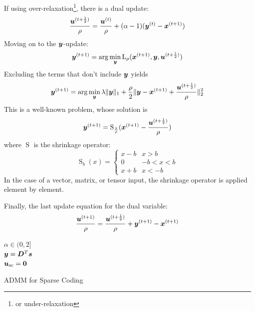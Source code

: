 If using over-relaxation\footnote{or under-relaxation}, there is a dual update:
\begin{equation}
\frac{\bm{u}^{(t + \frac{1}{2})}}{\rho} = \frac{\bm{u}^{(t)}}{\rho} + (\alpha - 1)(\bm{y}^{(t)} - \bm{x}^{(t + 1)})
\end{equation}
%
Moving on to the $\bm{y}$-update:
\begin{equation}
\bm{y}^{(t + 1)} = \arg\min_{\bm{y}} \operatorname{L}_{\rho}(\bm{x}^{(t + 1)},\bm{y},\bm{u}^{(t + \frac{1}{2})})
\end{equation}
%
Excluding the terms that don't include $\bm{y}$ yields
\begin{equation}
\bm{y}^{(t + 1)} = \arg\min_{\bm{y}} \lambda\|\bm{y}\|_1 + \frac{\rho}{2}\|\bm{y} - \bm{x}^{(t + 1)} + \frac{\bm{u}^{(t + \frac{1}{2})}}{\rho}\|_2^2
\end{equation}
%
This is a well-known problem, whose solution is
\begin{equation}
\bm{y}^{(t + 1)} = \operatorname{S}_{\frac{\lambda}{\rho}}(\bm{x}^{(t + 1)} - \frac{\bm{u}^{(t + \frac{1}{2})}}{\rho})
\end{equation}
where $\operatorname{S}$ is the shrinkage operator:
\begin{equation}
\operatorname{S}_{b}(x) = \begin{cases} x - b & x > b \\ 0 & -b < x < b \\ x + b & x < - b \end{cases}
\end{equation}
In the case of a vector, matrix, or tensor input, the shrinkage operator is applied element by element.

Finally, the last update equation for the dual variable:
\begin{equation}
\frac{\bm{u}^{(t + 1)}}{\rho} = \frac{\bm{u}^{(t + \frac{1}{2})}}{\rho} + \bm{y}^{(t + 1)} - \bm{x}^{(t + 1)}
\end{equation}

\begin{algorithm}[H] \label{algorithm:ADMM for Sparse Coding}
\SetAlgoLined
   $\alpha \in (0,2]$ \\
   $\bm{y} = \bm{D}^T\bm{s}$ \\
   $\bm{u}_{\text{sc}} = \bm{0}$ \\
 \caption{ADMM for Sparse Coding}
\end{algorithm}

